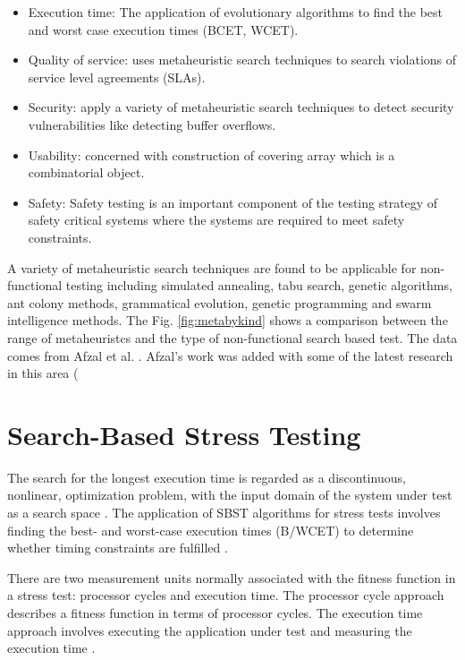 \documentclass{bmcart}
\begin{document}
\begin{itemize}
\item Execution time: The application of evolutionary algorithms to find the best and worst case execution times (BCET, WCET).
\item Quality of service: uses metaheuristic search techniques to search violations of service level agreements (SLAs).
\item Security: apply a variety of metaheuristic search techniques  to detect security vulnerabilities like detecting buffer overflows.
\item Usability: concerned with construction of covering array which is a combinatorial object.
\item Safety: Safety testing is an important component of the testing strategy of safety critical systems where the systems are required to meet safety constraints.
\end{itemize}

A variety of metaheuristic search techniques are found to be applicable for non-functional testing including simulated annealing, tabu search, genetic algorithms, ant colony methods, grammatical evolution, genetic programming and swarm intelligence methods. The Fig. \ref{fig:metabykind} shows a comparison between the range of metaheuristcs and the type of non-functional search based test. The data comes from Afzal et al. \citep{Afzal2009a}. Afzal's work was added with some of the latest research in this area (\citep{Garousi2006} \citep{Garousi2010} \citep{DiAlesio2013} \citep{DiAlesio2014} 


\section{Search-Based Stress Testing}

The search for the longest execution time is regarded as a discontinuous, nonlinear, optimization problem, with the input domain of the system under test as a search space \citep{Sullivan}.  The application of SBST algorithms for stress tests involves finding the best- and worst-case execution times (B/WCET) to determine whether timing constraints are fulfilled \citep{Afzal2009a}. 

There are two measurement units normally associated with the fitness function in a stress test: processor cycles and execution time. The processor cycle approach describes a fitness function in terms of processor cycles. The execution time approach involves executing the application under test and measuring the execution time \citep{Afzal2009a} \citep{tracey2000search}.
\end{document}
